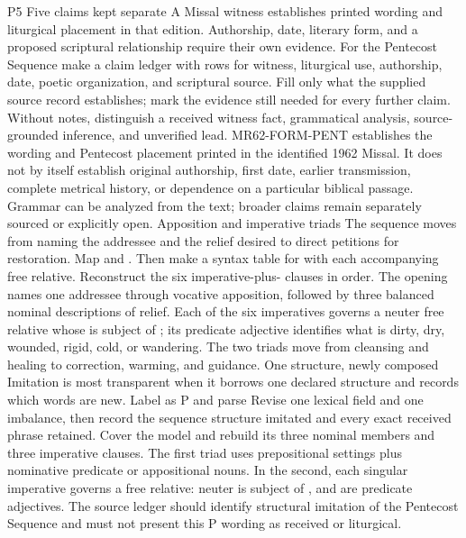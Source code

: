 \begin{courseunit}{P5}
\SubmoduleExtension
  {Five claims kept separate}
  {A Missal witness establishes printed wording and liturgical placement in
  that edition. Authorship, date, literary form, and a proposed scriptural
  relationship require their own evidence.}
  {For the Pentecost Sequence make a claim ledger with rows for witness,
  liturgical use, authorship, date, poetic organization, and scriptural source.
  Fill only what the supplied source record establishes; mark the evidence
  still needed for every further claim.}
  {Without notes, distinguish a received witness fact, grammatical analysis,
  source-grounded inference, and unverified lead.}
  {MR62-FORM-PENT establishes the wording and Pentecost placement printed in
  the identified 1962 Missal. It does not by itself establish original
  authorship, first date, earlier transmission, complete metrical history, or
  dependence on a particular biblical passage. Grammar can be analyzed from
  the text; broader claims remain separately sourced or explicitly open.}
\SubmoduleExtension
  {Apposition and imperative triads}
  {The sequence moves from naming the addressee and the relief desired to
  direct petitions for restoration.}
  {Map  and
  . Then make
  a syntax table for  with each
  accompanying free relative.}
  {Reconstruct the six imperative-plus- clauses in order.}
  {The opening names one addressee through vocative apposition, followed by
  three balanced nominal descriptions of relief. Each of the six imperatives
  governs a neuter free relative whose  is subject of
  ; its predicate adjective identifies what is dirty, dry,
  wounded, rigid, cold, or wandering. The two triads move from cleansing and
  healing to correction, warming, and guidance.}
\SubmoduleExtension
  {One structure, newly composed}
  {Imitation is most transparent when it borrows one declared structure and
  records which words are new.}
  {Label as P and parse  Revise one lexical field and one imbalance, then record the
  sequence structure imitated and every exact received phrase retained.}
  {Cover the model and rebuild its three nominal members and three imperative
  clauses.}
  {The first triad uses prepositional settings plus nominative predicate or
  appositional nouns. In the second, each singular imperative governs a free
  relative: neuter  is subject of , and
   are predicate adjectives. The source
  ledger should identify structural imitation of the Pentecost Sequence and
  must not present this P wording as received or liturgical.}
\end{courseunit}

